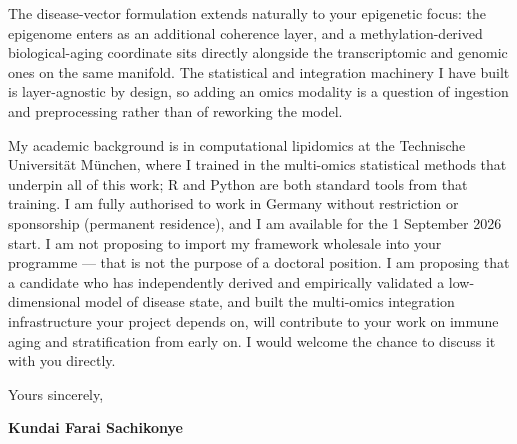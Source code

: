 \documentclass[12pt,a4paper]{article}
\begin{document}
The disease-vector formulation extends naturally to your epigenetic focus: the
epigenome enters as an additional coherence layer, and a methylation-derived
biological-aging coordinate sits directly alongside the transcriptomic and
genomic ones on the same manifold. The statistical and integration machinery
I have built is layer-agnostic by design, so adding an omics modality is a
question of ingestion and preprocessing rather than of reworking the model.

My academic background is in computational lipidomics at the Technische
Universit\"at M\"unchen, where I trained in the multi-omics statistical methods
that underpin all of this work; R and Python are both standard tools from that
training. I am fully authorised to work in Germany without restriction or
sponsorship (permanent residence), and I am available for the 1 September 2026
start. I am not proposing to import my framework wholesale into your programme
--- that is not the purpose of a doctoral position. I am proposing that a
candidate who has independently derived and empirically validated a
low-dimensional model of disease state, and built the multi-omics integration
infrastructure your project depends on, will contribute to your work on immune
aging and stratification from early on. I would welcome the chance to discuss it
with you directly.

\vspace{1.5em}
Yours sincerely,

\vspace{2.5em}
\textbf{Kundai Farai Sachikonye}
\end{document}
